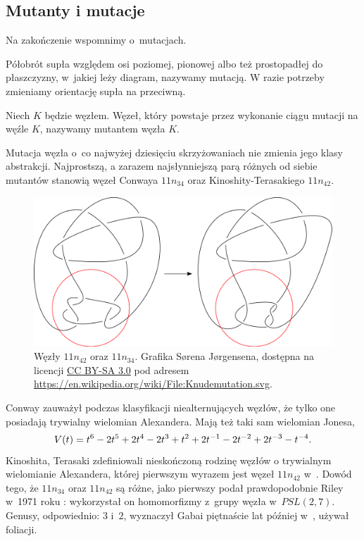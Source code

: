 
\subsection{Mutanty i mutacje}
%
%
\label{sec:mutant}%
Na zakończenie wspomnimy o~mutacjach.

\begin{definition}[mutacja]
    Półobrót supła względem osi poziomej, pionowej albo też prostopadłej do płaszczyzny, w~jakiej leży diagram, nazywamy mutacją.
    W razie potrzeby zmieniamy orientację supła na przeciwną.
\end{definition}

\begin{definition}[mutant]
\label{def:mutant}%
    Niech $K$ będzie węzłem.
    Węzeł, który powstaje przez wykonanie ciągu mutacji na węźle $K$, nazywamy mutantem węzła $K$.
\end{definition}

Mutacja węzła o~co najwyżej dziesięciu skrzyżowaniach nie zmienia jego klasy abstrakcji.
Najprostszą, a zarazem najsłynniejszą parą różnych od siebie mutantów stanowią węzeł Conwaya $11n_{34}$ oraz Kinoshity-Terasakiego $11n_{42}$.
%
%

\begin{figure}[H]
\centering
\includegraphics[width=0.601\linewidth]{../data/mixed/knudemutation.png}
\caption{Węzły $11n_{42}$ oraz $11n_{34}$. Grafika Sørena Jørgensena, dostępna na licencji \href{https://creativecommons.org/licenses/by-sa/3.0/deed.en}{CC BY-SA 3.0} pod adresem \url{https://en.wikipedia.org/wiki/File:Knudemutation.svg}.}
\end{figure}
Conway zauważył podczas klasyfikacji niealternujących węzłów, że tylko one posiadają trywialny wielomian Alexandera.
Mają też taki sam wielomian Jonesa,
\begin{equation}
    V(t) = t^{6} -2t^5 +2t^4 -2t^3 +t^2 +2t^{-1} -2t^{-2} +2t^{-3} -t^{-4}.
\end{equation}
Kinoshita, Terasaki zdefiniowali nieskończoną rodzinę węzłów o trywialnym wielomianie Alexandera, której pierwszym wyrazem jest węzeł $11n_{42}$ w~\cite{kinoshita57}.
%
%
Dowód tego, że $11n_{34}$ oraz $11n_{42}$ są różne, jako pierwszy podał prawdopodobnie Riley w~1971 roku \cite{riley71}: wykorzystał on homomorfizmy z~grupy węzła w~$PSL(2, 7)$.
%
Genusy, odpowiednio: $3$ i~$2$, wyznaczył Gabai piętnaście lat później w~\cite{gabai86}, używał foliacji.
%

